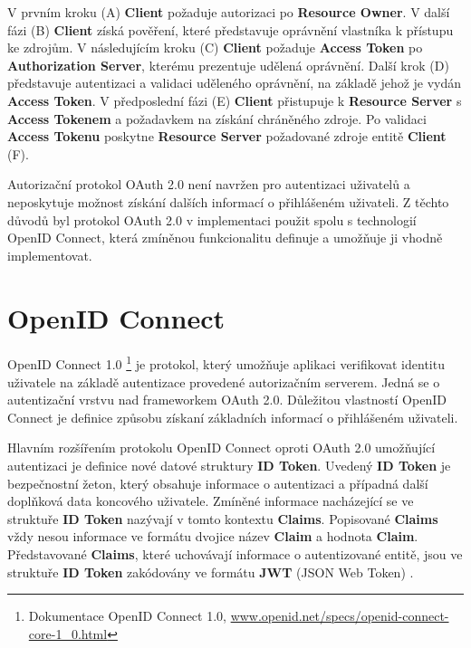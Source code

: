 \documentclass[
  printed, %
  twoside, %
  table,   %
  nolof,     %
  nolot,     %
]{fithesis3}
\begin{document}
V prvním kroku (A) \textbf{Client} požaduje autorizaci po \textbf{Resource Owner}. V další fázi (B) \textbf{Client} získá pověření, které představuje oprávnění vlastníka k přístupu ke zdrojům. V následujícím kroku (C) \textbf{Client} požaduje \textbf{Access Token} po \textbf{Authorization Server}, kterému prezentuje udělená oprávnění. Další krok (D) představuje autentizaci a validaci uděleného oprávnění, na základě jehož je vydán \textbf{Access Token}. V předposlední fázi (E) \textbf{Client} přistupuje k \textbf{Resource Server} s \textbf{Access Tokenem} a požadavkem na získání chráněného zdroje. Po validaci \textbf{Access Tokenu} poskytne \textbf{Resource Server} požadované zdroje entitě \textbf{Client} (F). \par 

Autorizační protokol OAuth 2.0 není navržen pro autentizaci uživatelů a neposkytuje možnost získání dalších informací o přihlášeném uživateli. Z těchto důvodů byl protokol OAuth 2.0 v implementaci použit spolu s technologií OpenID Connect, která zmíněnou funkcionalitu definuje a umožňuje ji vhodně implementovat. 

\section{OpenID Connect}
\label{sec:oidc}
OpenID Connect 1.0 \footnote{Dokumentace OpenID Connect 1.0, \url{www.openid.net/specs/openid-connect-core-1_0.html}} je protokol, který umožňuje aplikaci verifikovat identitu uživatele na základě autentizace provedené autorizačním serverem. Jedná se o autentizační vrstvu nad frameworkem OAuth 2.0. Důležitou vlastností OpenID Connect je definice způsobu získaní základních informací o přihlášeném uživateli. \par

Hlavním rozšířením protokolu OpenID Connect oproti OAuth 2.0 umožňující autentizaci je definice nové datové struktury \textbf{ID Token}. Uvedený \textbf{ID Token} je bezpečnostní žeton, který obsahuje informace o autentizaci a případná další doplňková data koncového uživatele. Zmíněné informace nacházející se ve struktuře \textbf{ID Token} nazývají v tomto kontextu \textbf{Claims}. Popisované \textbf{Claims} vždy nesou informace ve formátu dvojice název \textbf{Claim} a hodnota \textbf{Claim}. Představované \textbf{Claims}, které uchovávají informace o autentizované entitě, jsou ve struktuře \textbf{ID Token} zakódovány ve formátu \textbf{JWT} (JSON Web Token) \cite{rfc7519}.    

\par
\end{document}
